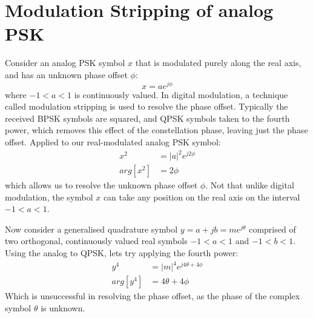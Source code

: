 \documentclass{article}
\begin{document}
\section{Modulation Stripping of analog PSK}

Consider an analog PSK symbol $x$ that is modulated purely along the real axis, and has an unknown phase offset $\phi$:
\begin{equation}
x = ae^{j\phi}
\end{equation}
where $-1<a<1$ is continuously valued.  In digital modulation, a technique called modulation stripping is used to resolve the phase offset. Typically the received BPSK symbols are squared, and QPSK symbols taken to the fourth power, which removes this effect of the constellation phase, leaving just the phase offset.  Applied to our real-modulated analog PSK symbol:
\begin{equation}
\begin{split}
x^2 &= |a|^2e^{j2\phi} \\
arg[x^2] &= 2\phi
\end{split}
\end{equation}
which allows us to resolve the unknown phase offset $\phi$.  Not that unlike digital modulation, the symbol $x$ can take any position on the real axis on the interval $-1<a<1$.

Now consider a generalised quadrature symbol $y=a+jb=me^{j\theta}$ comprised of two orthogonal, continuously valued real symbols $-1<a<1$ and $-1<b<1$.  Using the analog to QPSK, lets try applying the fourth power:
\begin{equation}
\begin{split}
y^4 &= |m|^4e^{j4\theta+4\phi} \\
arg[y^4] &= 4\theta+4\phi
\end{split}
\end{equation}
Which is unsuccessful in resolving the phase offset, as the phase of the complex symbol $\theta$ is unknown.
\end{document}
